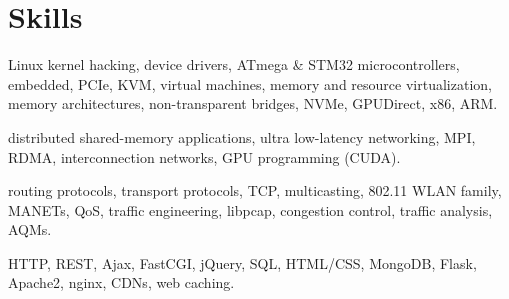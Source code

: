 \section{Skills}

{Linux kernel hacking, device drivers, ATmega \& STM32 microcontrollers, embedded,
PCIe, KVM, virtual machines, memory and resource virtualization,
memory architectures, non-transparent bridges, NVMe, GPUDirect,  x86, ARM.}

{distributed shared-memory applications, ultra low-latency networking, MPI, RDMA, interconnection networks, GPU programming (CUDA).}

{routing protocols, transport protocols, TCP, multicasting, 802.11 WLAN family, MANETs, QoS, 
traffic engineering, libpcap, congestion control, traffic analysis, AQMs.}

{HTTP, REST, Ajax, FastCGI, jQuery, SQL, HTML/CSS, MongoDB, Flask, Apache2, nginx, CDNs, web caching.}
